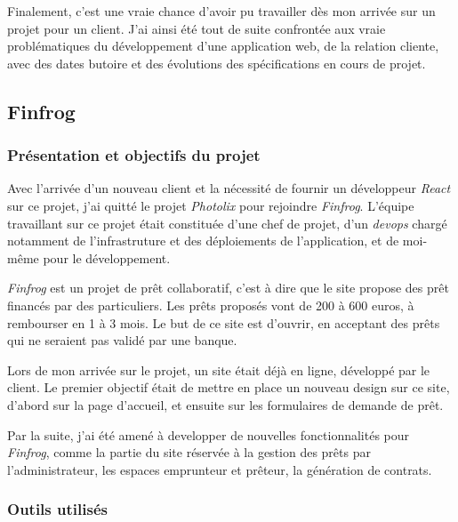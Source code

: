 \documentclass[12pt,a4paper]{article}
\begin{document}
  \bigskip

  Finalement, c'est une vraie chance d'avoir pu travailler dès mon arrivée
  sur un projet pour un client. J'ai ainsi été tout de suite confrontée
  aux vraie problématiques du développement d'une application web, de la
  relation cliente, avec des dates butoire et des évolutions des
  spécifications en cours de projet.

  \subsection{Finfrog}\label{finfrog}

  \subsubsection{Présentation et objectifs du
  projet}\label{pruxe9sentation-et-objectifs-du-projet-1}

  \bigskip

  Avec l'arrivée d'un nouveau client et la nécessité de fournir un
  développeur \emph{React} sur ce projet, j'ai quitté le projet
  \emph{Photolix} pour rejoindre \emph{Finfrog}. L'équipe travaillant sur
  ce projet était constituée d'une chef de projet, d'un \emph{devops}
  chargé notamment de l'infrastruture et des déploiements de
  l'application, et de moi-même pour le développement.

  \bigskip

  \emph{Finfrog} est un projet de prêt collaboratif, c'est à dire que le
  site propose des prêt financés par des particuliers. Les prêts proposés
  vont de 200 à 600 euros, à rembourser en 1 à 3 mois. Le but de ce site
  est d'ouvrir, en acceptant des prêts qui ne seraient pas validé par une
  banque.

  \bigskip

  Lors de mon arrivée sur le projet, un site était déjà en ligne,
  développé par le client. Le premier objectif était de mettre en place un
  nouveau design sur ce site, d'abord sur la page d'accueil, et ensuite
  sur les formulaires de demande de prêt.

  \bigskip

  Par la suite, j'ai été amené à developper de nouvelles fonctionnalités
  pour \emph{Finfrog}, comme la partie du site réservée à la gestion des
  prêts par l'administrateur, les espaces emprunteur et prêteur, la
  génération de contrats.

  \subsubsection{Outils utilisés}\label{outils-utilisuxe9s-1}
\end{document}
